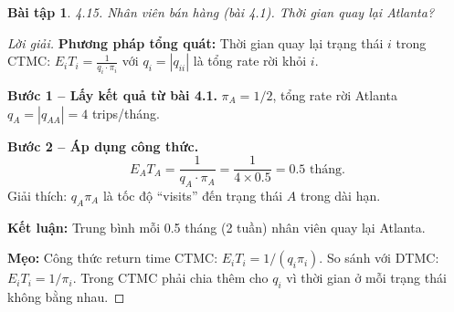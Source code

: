\documentclass[8pt,a4paper]{article}
\newtheorem{exercise}{Bài tập}
\newenvironment{solution}{\begin{proof}[Lời giải]}{\end{proof}}
\begin{document}
\begin{exercise}
4.15. Nhân viên bán hàng (bài 4.1). Thời gian quay lại Atlanta?
\end{exercise}
\begin{solution}
\textbf{Phương pháp tổng quát:} Thời gian quay lại trạng thái $i$ trong CTMC: $\boxed{E_i T_i = \frac{1}{q_i \cdot \pi_i}}$ với $q_i = |q_{ii}|$ là tổng rate rời khỏi $i$.

\textbf{Bước 1 -- Lấy kết quả từ bài 4.1.} $\pi_A = 1/2$, tổng rate rời Atlanta $q_A = |q_{AA}| = 4$ trips/tháng.

\textbf{Bước 2 -- Áp dụng công thức.}
\[
E_A T_A = \frac{1}{q_A \cdot \pi_A} = \frac{1}{4 \times 0.5} = \boxed{0.5 \text{ tháng}}.
\]
Giải thích: $q_A \pi_A$ là tốc độ ``visits'' đến trạng thái $A$ trong dài hạn.

\textbf{Kết luận:} Trung bình mỗi 0.5 tháng (2 tuần) nhân viên quay lại Atlanta.

\textbf{Mẹo:} Công thức return time CTMC: $E_i T_i = 1/(q_i \pi_i)$. So sánh với DTMC: $E_i T_i = 1/\pi_i$. Trong CTMC phải chia thêm cho $q_i$ vì thời gian ở mỗi trạng thái không bằng nhau.
\end{solution}
\end{document}
